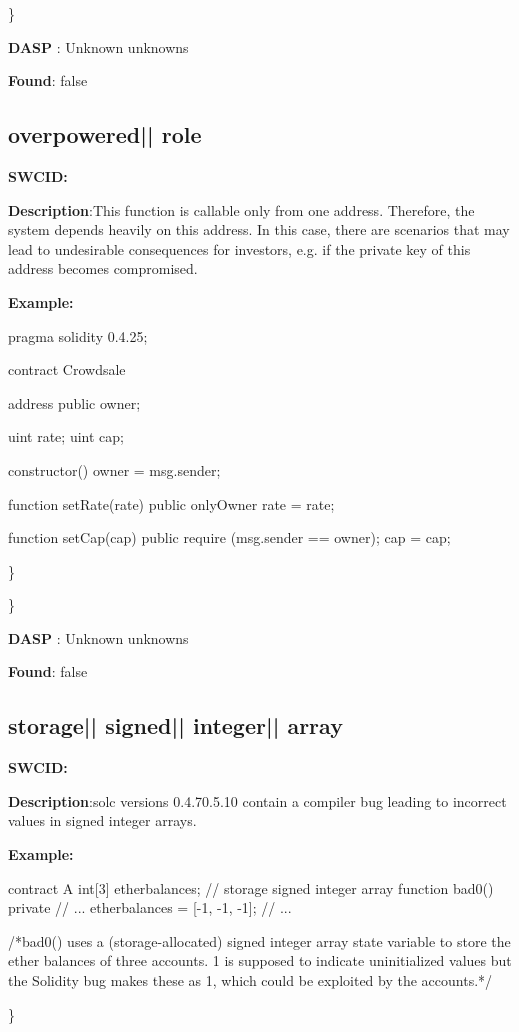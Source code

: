 \documentclass{article}
\begin{document}
\} 

\textbf{DASP} : Unknown unknowns

\textbf{Found}: false

\subsection{overpowered{|\textunderscore| }role} 
\textbf{SWC{\textunderscore }ID:} 

\textbf{Description}:This function is callable only from one address. Therefore, the system depends heavily on this address. In this case, there are scenarios that may lead to undesirable consequences for investors, e.g. if the private key of this address becomes compromised.


\textbf{Example:} 
\begin{ffcode} 

pragma solidity 0.4.25;

contract Crowdsale {

    address public owner;

    uint rate;
    uint cap;

    constructor() {
        owner = msg.sender;
    }

    function setRate(\textunderscore rate) public onlyOwner {
        rate = \textunderscore rate;
    }

    function setCap(\textunderscore cap) public {
        require (msg.sender == owner);
        cap = \textunderscore cap;
    }
}

\end{ffcode} 
\} 

\} 

\textbf{DASP} : Unknown unknowns

\textbf{Found}: false

\subsection{storage{|\textunderscore| }signed{|\textunderscore| }integer{|\textunderscore| }array} 
\textbf{SWC{\textunderscore }ID:} 

\textbf{Description}:solc versions 0.4.7{\textendash}0.5.10 contain a compiler bug leading to incorrect values in signed integer arrays.


\textbf{Example:} 
\begin{ffcode} 

contract A {
  int[3] ether\textunderscore balances; // storage signed integer array
  function bad0() private {
    // ...
    ether\textunderscore balances = [-1, -1, -1];
    // ...
  }
}

 /*bad0() uses a (storage-allocated) signed integer array state variable to store the ether balances of three accounts. 1 is supposed to indicate uninitialized values but the Solidity bug makes these as 1, which could be exploited by the accounts.*/ 

\end{ffcode} 
\} 
\end{document}

